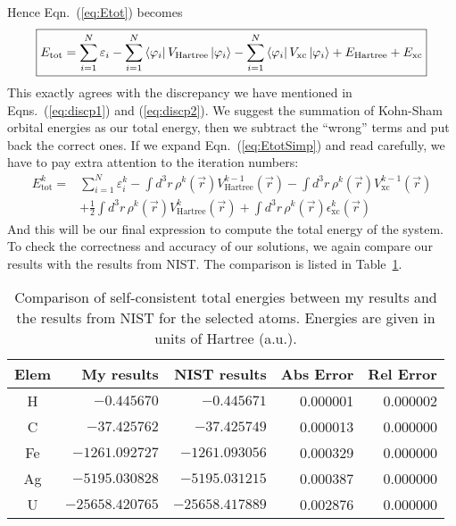 %
Hence Eqn.~(\ref{eq:Etot}) becomes
\begin{equation} \label{eq:EtotSimp}
\boxed{E_\text{tot} = \sum_{i=1}^N{\varepsilon_i} - \sum_{i=1}^N{\Bra{\varphi_i} V_\text{Hartree} \Ket{\varphi_i}} - \sum_{i=1}^N{\Bra{\varphi_i} V_\text{xc} \Ket{\varphi_i}} + E_\text{Hartree} + E_\text{xc}}
\end{equation}
This exactly agrees with the discrepancy we have mentioned in Eqns.~(\ref{eq:discp1})
and (\ref{eq:discp2}). We suggest the summation of Kohn-Sham orbital energies as our
total energy, then we subtract the ``wrong'' terms and put back the correct ones.
If we expand Eqn.~(\ref{eq:EtotSimp}) and read carefully, we have to pay extra
attention to the iteration numbers:
\begin{align} \label{eq:EtotIter}
E_\text{tot}^k = {} & \sum_{i=1}^N{\varepsilon_i^k} - \int d^3r\, \rho^k(\vec{r})V_\text{Hartree}^{k-1}(\vec{r}) - \int d^3r\, \rho^k(\vec{r})V_\text{xc}^{k-1}(\vec{r}) \nonumber \\
                    & + \frac{1}{2}\int d^3r\, \rho^k(\vec{r})V_\text{Hartree}^k(\vec{r}) + \int d^3r\, \rho^k(\vec{r})\epsilon_\text{xc}^k(\vec{r})
\end{align}
And this will be our final expression to compute the total energy of the system.
To check the correctness and accuracy of our solutions, we again compare our results
with the results from NIST. The comparison is listed in Table~\ref{table:SCFEtot}.
\begin{table}[h!]
\caption{Comparison of self-consistent total energies between my results and
the results from NIST for the selected atoms. Energies are given in units of Hartree (a.u.).}
\label{table:SCFEtot}
\begin{center}
\begin{tabular}{ c | r | r | r | r }
  \hline
  Elem & My results & NIST results & Abs Error & Rel Error \\ \hline \hline
  H    & $-0.445670$     & $-0.445671$     & 0.000001 & 0.000002 \\ \hline
  C    & $-37.425762$    & $-37.425749$    & 0.000013 & 0.000000 \\ \hline
 Fe    & $-1261.092727$  & $-1261.093056$  & 0.000329 & 0.000000 \\ \hline
 Ag    & $-5195.030828$  & $-5195.031215$  & 0.000387 & 0.000000 \\ \hline
  U    & $-25658.420765$ & $-25658.417889$ & 0.002876 & 0.000000 \\
  \hline  
\end{tabular}
\end{center}
\end{table}
